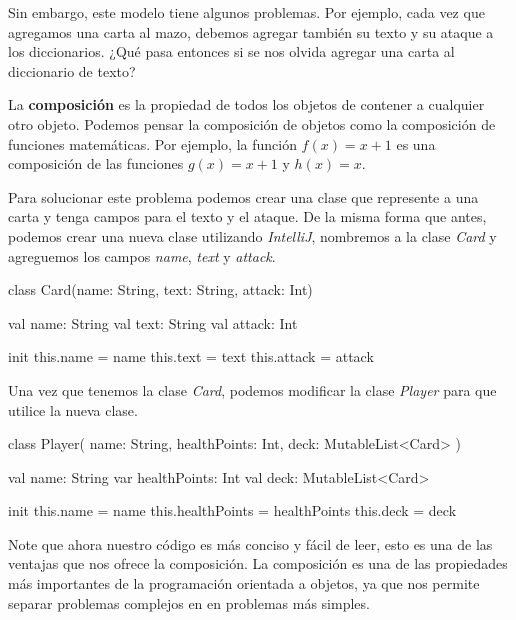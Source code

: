   Sin embargo, este modelo tiene algunos problemas.
  Por ejemplo, cada vez que agregamos una carta al mazo, debemos agregar también su texto y su
  ataque a los diccionarios.
  ¿Qué pasa entonces si se nos olvida agregar una carta al diccionario de texto?

  \begin{defaultbox}[Composición]
    La \textbf{composición} es la propiedad de todos los objetos de contener a 
    cualquier otro objeto.
    Podemos pensar la composición de objetos como la composición de funciones matemáticas.
    Por ejemplo, la función \(f(x) = x + 1\) es una composición de las funciones \(g(x) = x + 1\) y
    \(h(x) = x\).
  \end{defaultbox}

  Para solucionar este problema podemos crear una clase que represente a una carta y tenga campos
  para el texto y el ataque.
  De la misma forma que antes, podemos crear una nueva clase utilizando \textit{IntelliJ}, 
  nombremos a la clase \textit{Card} y agreguemos los campos \textit{name}, \textit{text} y
  \textit{attack}.

  \begin{kotlin}
    class Card(name: String, text: String, attack: Int) {
      val name: String
      val text: String
      val attack: Int

      init {
        this.name = name
        this.text = text
        this.attack = attack
      }
    }
  \end{kotlin}

  Una vez que tenemos la clase \textit{Card}, podemos modificar la clase \textit{Player} para que
  utilice la nueva clase.

  \begin{kotlin}
    class Player(
      name: String,
      healthPoints: Int,
      deck: MutableList<Card>
    ) {
      val name: String
      var healthPoints: Int
      val deck: MutableList<Card>

      init {
        this.name = name
        this.healthPoints = healthPoints
        this.deck = deck
      }
    }
  \end{kotlin}

  Note que ahora nuestro código es más conciso y fácil de leer, esto es una de las ventajas que
  nos ofrece la composición.
  La composición es una de las propiedades más importantes de la programación orientada a objetos,
  ya que nos permite separar problemas complejos en en problemas más simples.

